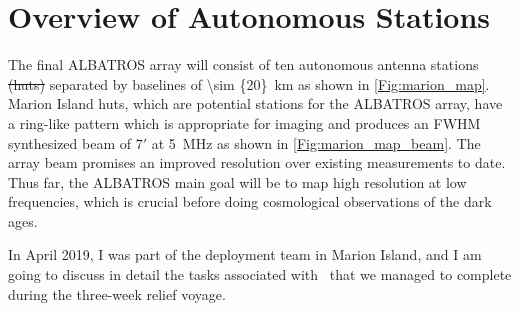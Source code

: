 \section{Overview of Autonomous Stations}

The final ALBATROS array will consist of ten autonomous antenna stations \st{(huts)} separated by baselines of \SI{\sim {20}}{km}  as shown in \autoref{Fig:marion_map}.   Marion Island huts, which are potential stations for the ALBATROS array, have a ring-like pattern which is appropriate for imaging and produces an FWHM synthesized beam of $7'$ at \SI{5}{\mega\hertz} as shown in \ref{Fig:marion_map_beam}. The array beam promises an improved  resolution over existing measurements to date. Thus far, the ALBATROS main goal will be to map  high resolution  at low frequencies, which is crucial before doing cosmological observations of the dark ages. 

In April 2019, I was part of the deployment team in Marion Island, and I am going to discuss in detail the tasks associated with \albatros\ that we managed to complete during the three-week relief voyage.  

